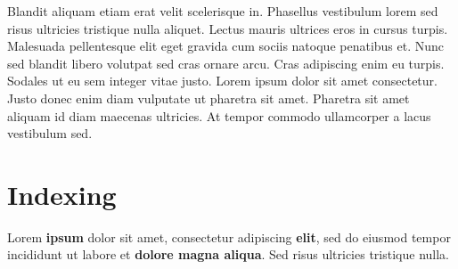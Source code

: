 \documentclass[a4paper, 12pt]{report}
\begin{document}
Blandit aliquam etiam erat velit scelerisque in. Phasellus vestibulum lorem sed risus ultricies tristique nulla aliquet. Lectus mauris ultrices eros in cursus turpis. Malesuada pellentesque elit eget gravida cum sociis natoque penatibus et. Nunc sed blandit libero volutpat sed cras ornare arcu. Cras adipiscing enim eu turpis. Sodales ut eu sem integer vitae justo. Lorem ipsum dolor sit amet consectetur. Justo donec enim diam vulputate ut pharetra sit amet. Pharetra sit amet aliquam id diam maecenas ultricies. At tempor commodo ullamcorper a lacus vestibulum sed. \citep{clear2018atomic}



\chapter{Indexing}
Lorem \textbf{ipsum} dolor sit amet, consectetur adipiscing \textbf{elit}, sed do eiusmod tempor incididunt ut labore et \textbf{dolore magna aliqua}. Sed risus ultricies tristique nulla.






\printindex
\end{document}
